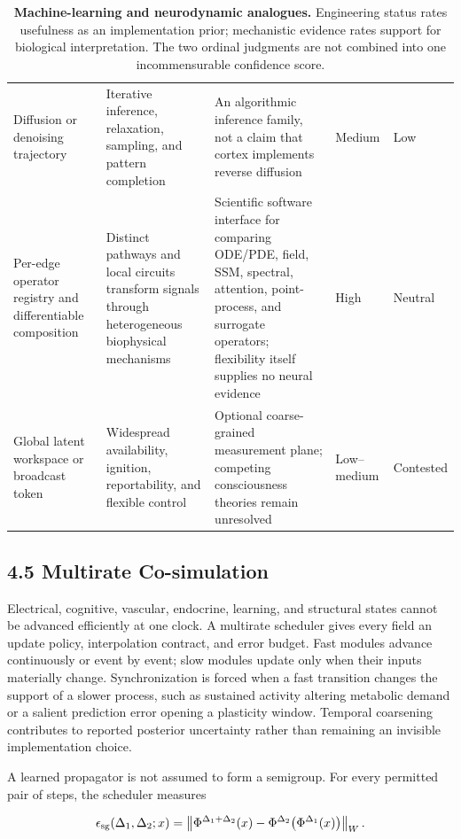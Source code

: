 \begin{table}[t]
\begin{tabularx}{\textwidth}{@{}p{}p{}X p{}p{}@{}}
Diffusion or denoising trajectory &
Iterative inference, relaxation, sampling, and pattern completion &
An algorithmic inference family, not a claim that cortex implements reverse diffusion &
Medium & Low\\

Per-edge operator registry and differentiable composition &
Distinct pathways and local circuits transform signals through heterogeneous biophysical mechanisms &
Scientific software interface for comparing ODE/PDE, field, SSM, spectral, attention, point-process, and surrogate operators; flexibility itself supplies no neural evidence &
High & Neutral\\

Global latent workspace or broadcast token &
Widespread availability, ignition, reportability, and flexible control &
Optional coarse-grained measurement plane; competing consciousness theories remain unresolved &
Low--medium & Contested\\
\bottomrule
\end{tabularx}
\caption{\textbf{Machine-learning and neurodynamic analogues.} Engineering
status rates usefulness as an implementation prior; mechanistic evidence rates
support for biological interpretation. The two ordinal judgments are not
combined into one incommensurable confidence score.}
\label{tab:analogues}
\end{table}

\subsection{4.5 Multirate Co-simulation}

Electrical, cognitive, vascular, endocrine, learning, and structural states
cannot be advanced efficiently at one clock. A multirate scheduler gives every
field an update policy, interpolation contract, and error budget. Fast modules
advance continuously or event by event; slow modules update only when their
inputs materially change. Synchronization is forced when a fast transition
changes the support of a slower process, such as sustained activity altering
metabolic demand or a salient prediction error opening a plasticity window.
Temporal coarsening contributes to reported posterior uncertainty rather than
remaining an invisible implementation choice.

A learned propagator is not assumed to form a semigroup. For every permitted
pair of steps, the scheduler measures

\[
\epsilon_{\rm sg}(\Delta_1,\Delta_2;x)=
\left\|\Phi^{\Delta_1+\Delta_2}(x)-
\Phi^{\Delta_2}\!\left(\Phi^{\Delta_1}(x)\right)\right\|_W .
\]

